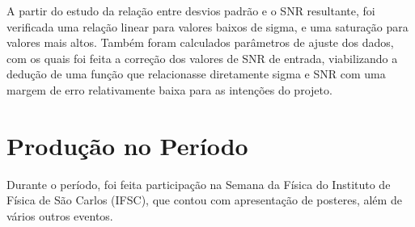 \documentclass{article}
\begin{document}
A partir do estudo da relação entre desvios padrão e o SNR resultante, 
foi verificada uma relação linear para valores baixos de sigma, e uma 
saturação para valores mais altos. Também foram calculados 
parâmetros de ajuste dos dados, com os quais foi feita a correção dos 
valores de SNR de entrada, viabilizando a dedução de uma função que 
relacionasse diretamente sigma e SNR com uma margem de erro 
relativamente baixa para as intenções do projeto.





\section{Produção no Período}

Durante o período, foi feita participação na Semana da Física do Instituto de Física de São Carlos (IFSC),
que contou com apresentação de posteres, além de vários outros eventos.


\end{document}

